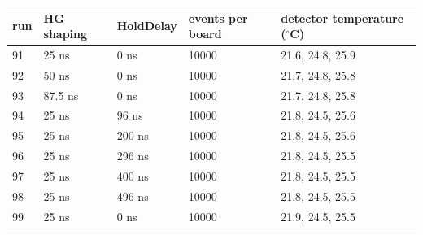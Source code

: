 \begin{tabular}{lllll}
\toprule
run & HG shaping & HoldDelay & events per board & detector temperature ($^\circ$C) \\
\midrule
91 & 25 ns & 0 ns & 10000 & 21.6, 24.8, 25.9 \\
92 & 50 ns & 0 ns & 10000 & 21.7, 24.8, 25.8 \\
93 & 87.5 ns & 0 ns & 10000 & 21.7, 24.8, 25.8 \\
94 & 25 ns & 96 ns & 10000 & 21.8, 24.5, 25.6 \\
95 & 25 ns & 200 ns & 10000 & 21.8, 24.5, 25.6 \\
96 & 25 ns & 296 ns & 10000 & 21.8, 24.5, 25.5 \\
97 & 25 ns & 400 ns & 10000 & 21.8, 24.5, 25.5 \\
98 & 25 ns & 496 ns & 10000 & 21.8, 24.5, 25.5 \\
99 & 25 ns & 0 ns & 10000 & 21.9, 24.5, 25.5 \\
\bottomrule
\end{tabular}
